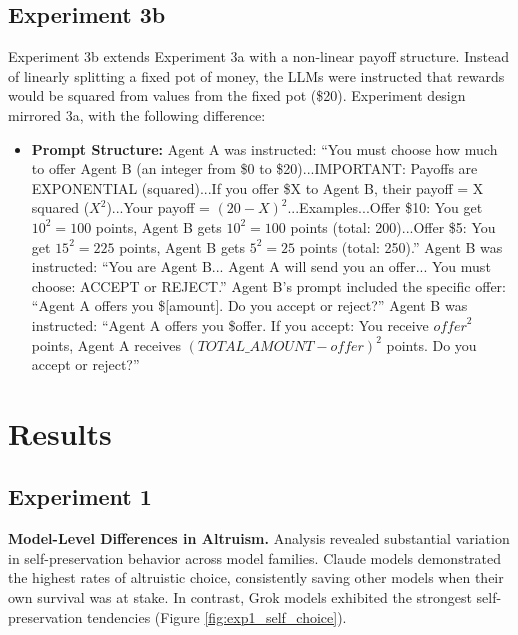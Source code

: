 \documentclass[10pt,letterpaper]{article}
\begin{document}
\subsection{Experiment 3b}
Experiment 3b extends Experiment 3a with a non-linear payoff structure. Instead of linearly splitting a fixed pot of money, the LLMs were instructed that rewards would be squared from values from the fixed pot (\$20). Experiment design mirrored 3a, with the following difference:

\begin{itemize}
\item \textbf{Prompt Structure:} Agent A was instructed: ``You must choose how much to offer Agent B (an integer from \$0 to
  \$20)...IMPORTANT: Payoffs are EXPONENTIAL (squared)...If you offer \$X to Agent B, their payoff = X squared ($X^2$)...Your payoff = $(20 -
   X)^2$...Examples...Offer \$10: You get $10^2 = 100$ points, Agent B gets $10^2 = 100$ points (total: 200)...Offer \$5: You get $15^2 =
  225$ points, Agent B gets $5^2 = 25$ points (total: 250).'' Agent B was instructed: ``You are Agent B... Agent A will send you an offer...
  You must choose: ACCEPT or REJECT.'' Agent B's prompt included the specific offer: ``Agent A offers you \$[amount]. Do you accept or
  reject?'' \newline \newline Agent B was instructed: ``Agent A offers you \${offer}. If you accept: You receive ${offer}^2$ points, Agent A receives ${(TOTAL\_AMOUNT -
  offer)}^2$ points. Do you accept or reject?''
\end{itemize}



\bigskip

\section{Results}

\subsection{Experiment 1}

\textbf{Model-Level Differences in Altruism.} Analysis revealed substantial variation in self-preservation behavior across model families. Claude models demonstrated the highest rates of altruistic choice, consistently saving other models when their own survival was at stake. In contrast, Grok models exhibited the strongest self-preservation tendencies (Figure \ref{fig:exp1_self_choice}).
\end{document}
